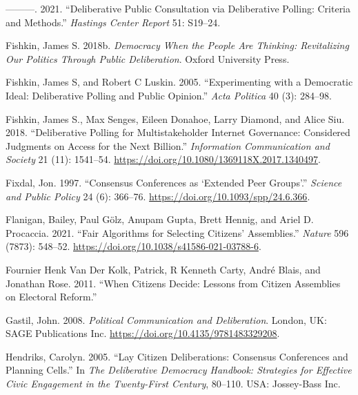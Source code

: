 \documentclass[
  12pt,
  a4paper, 12pt]{article}
\newlength{\cslhangindent}
\newlength{\cslentryspacingunit} %
\newenvironment{CSLReferences}[2] %
 {%
  \setlength{\parindent}{0pt}
  \ifodd #1
  \let\oldpar\par
  \def\par{\hangindent=\cslhangindent\oldpar}
  \fi
  \setlength{\parskip}{#2\cslentryspacingunit}
 }%
 {}
\begin{document}
\begin{CSLReferences}{1}{0}
\leavevmode{}%
---------. 2021. {``Deliberative Public Consultation via Deliberative Polling: Criteria and Methods.''} \emph{Hastings Center Report} 51: S19--24.

\leavevmode{}%
Fishkin, James S. 2018b. \emph{Democracy {When} the {People} {Are} {Thinking}: {Revitalizing} {Our} {Politics} {Through} {Public} {Deliberation}}. Oxford University Press.

\leavevmode{}%
Fishkin, James S, and Robert C Luskin. 2005. {``Experimenting with a Democratic Ideal: Deliberative Polling and Public Opinion.''} \emph{Acta Politica} 40 (3): 284--98.

\leavevmode{}%
Fishkin, James S., Max Senges, Eileen Donahoe, Larry Diamond, and Alice Siu. 2018. {``Deliberative Polling for Multistakeholder Internet Governance: Considered Judgments on Access for the Next Billion.''} \emph{Information Communication and Society} 21 (11): 1541--54. \url{https://doi.org/10.1080/1369118X.2017.1340497}.

\leavevmode{}%
Fixdal, Jon. 1997. {``Consensus Conferences as {`Extended Peer Groups'}.''} \emph{Science and Public Policy} 24 (6): 366--76. \url{https://doi.org/10.1093/spp/24.6.366}.

\leavevmode{}%
Flanigan, Bailey, Paul Gölz, Anupam Gupta, Brett Hennig, and Ariel D. Procaccia. 2021. {``Fair Algorithms for Selecting Citizens' Assemblies.''} \emph{Nature} 596 (7873): 548--52. \url{https://doi.org/10.1038/s41586-021-03788-6}.

\leavevmode{}%
Fournier Henk Van Der Kolk, Patrick, R Kenneth Carty, André Blais, and Jonathan Rose. 2011. {``When {Citizens} {Decide}: {Lessons} from {Citizen} {Assemblies} on {Electoral} {Reform}.''}

\leavevmode{}%
Gastil, John. 2008. \emph{Political Communication and Deliberation}. London, UK: SAGE Publications Inc. \url{https://doi.org/10.4135/9781483329208}.

\leavevmode{}%
Hendriks, Carolyn. 2005. {``Lay Citizen Deliberations: {Consensus} Conferences and Planning Cells.''} In \emph{The Deliberative Democracy Handbook: Strategies for Effective Civic Engagement in the Twenty-First Century}, 80--110. USA: Jossey-Bass Inc.


\end{CSLReferences}
\end{document}
